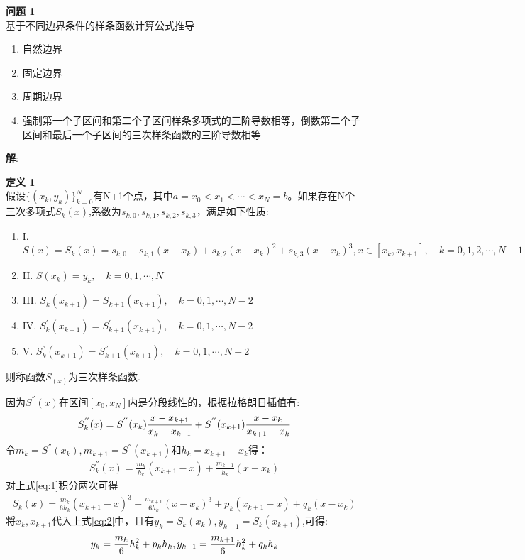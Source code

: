 \documentclass[UTF8]{ctexart}
\newenvironment{problem}[2][问题]
{\begin{mdframed}[backgroundcolor=gray!20] \textbf{#1 #2} \\}
	{\end{mdframed}}
\newenvironment{dingyi}[2][定义]
{\begin{mdframed}[backgroundcolor=gray!20] \textbf{#1 #2} \\}
	{\end{mdframed}}
\begin{document}
\begin{problem}{1}
基于不同边界条件的样条函数计算公式推导
\begin{enumerate}
	\item 自然边界
	\item 固定边界
	\item 周期边界
	\item 强制第一个子区间和第二个子区间样条多项式的三阶导数相等，倒数第二个子区间和最后一个子区间的三次样条函数的三阶导数相等
\end{enumerate}
\end{problem}
\textbf{解}:\\
\begin{dingyi}{1}
	 假设$\{(x_k,y_k)\}_{k=0}^{N}$有N+1个点，其中$a=x_0<x_1<\cdots <x_N=b$。如果存在N个三次多项式$S_k(x)$,系数为$s_{k,0},s_{k,1},s_{k,2},s_{k,3}$，满足如下性质:
	\begin{enumerate}
		\item I. $S(x)=S_k(x)=s_{k,0}+s_{k,1}(x-x_k)+s_{k,2}(x-x_k)^2+s_{k,3}(x-x_k)^3,x\in [x_k,x_{k+1}],\quad k=0,1,2,\cdots,N-1$
		\item II. $S(x_k)=y_k,\quad k=0,1,\cdots ,N$
		\item III. $S_k(x_{k+1})=S_{k+1}(x_{k+1}),\quad k=0,1,\cdots ,N-2$
		\item IV. $S_k^{'}(x_{k+1})=S_{k+1}^{'}(x_{k+1}),\quad k=0,1,\cdots ,N-2$
		\item V. $S_k^{''}(x_{k+1})=S_{k+1}^{''}(x_{k+1}),\quad k=0,1,\cdots ,N-2$
	\end{enumerate}
	则称函数$S_(x)$为三次样条函数.
\end{dingyi}
因为$S^{''}(x)$在区间$[x_0,x_N]$内是分段线性的，根据拉格朗日插值有:
\begin{align}
	S_k^{''}(x)=S^{''}(x_k)\frac{x-x_{k+1}}{x_k-x_{k+1}}+S^{''}(x_{k+1})\frac{x-x_k}{x_{k+1}-x_k} \notag
\end{align}
令$m_k=S^{''}(x_k),m_{k+1}=S^{''}(x_{k+1})$和$h_k=x_{k+1}-x_k$得：
\begin{align}
	S_k^{''}(x)=\frac{m_k}{h_k}(x_{k+1}-x)+\frac{m_{k+1}}{h_k}(x-x_k)\label{eq:1}
\end{align}
对上式\ref{eq:1}积分两次可得
\begin{align}
	S_k(x)=\frac{m_k}{6h_k}(x_{k+1}-x)^3+\frac{m_{k+1}}{6h_k}(x-x_k)^3+p_k(x_{k+1}-x)+q_k(x-x_k)\label{eq:2}
\end{align}
将$x_k,x_{k+1}$代入上式\ref{eq:2}中，且有$y_k=S_k(x_k),y_{k+1}=S_k(x_{k+1})$,可得:
\begin{align}
	y_k=\frac{m_k}{6}h_k^2+p_k h_k , y_{k+1}=\frac{m_{k+1}}{6}h_k^2+q_k h_k  \notag
\end{align}
\end{document}
